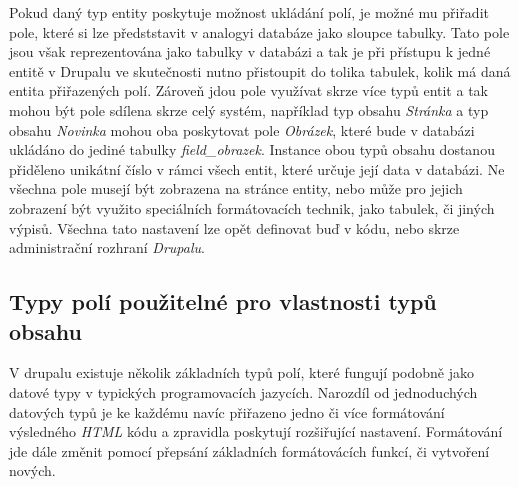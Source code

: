 Pokud daný typ entity poskytuje možnost ukládání polí, je možné mu přiřadit pole, které si lze předststavit v analogyi databáze jako sloupce tabulky. Tato pole jsou však reprezentována jako tabulky v databázi a tak je při přístupu k jedné entitě v Drupalu ve skutečnosti nutno přistoupit do tolika tabulek, kolik má daná entita přiřazených polí. Zároveň jdou pole využívat skrze více typů entit a tak mohou být pole sdílena skrze celý systém, například typ obsahu \emph{Stránka} a typ obsahu \emph{Novinka} mohou oba poskytovat pole \emph{Obrázek}, které bude v databázi ukládáno do jediné tabulky \emph{field\_obrazek}. Instance obou typů obsahu dostanou přiděleno unikátní číslo v rámci všech entit, které určuje její data v databázi. Ne všechna pole musejí být zobrazena na stránce entity, nebo může pro jejich zobrazení být využito speciálních formátovacích technik, jako tabulek, či jiných výpisů. Všechna tato nastavení lze opět definovat buď v kódu, nebo skrze administrační rozhraní \emph{Drupalu}.

\subsection{Typy polí použitelné pro vlastnosti typů obsahu}
V drupalu existuje několik základních typů polí, které fungují podobně jako datové typy v typických programovacích jazycích. Narozdíl od jednoduchých datových typů je ke každému navíc přiřazeno jedno či více formátování výsledného \emph{HTML} kódu a zpravidla poskytují rozšiřující nastavení. Formátování jde dále změnit pomocí přepsání základních formátovácích funkcí, či vytvoření nových.

